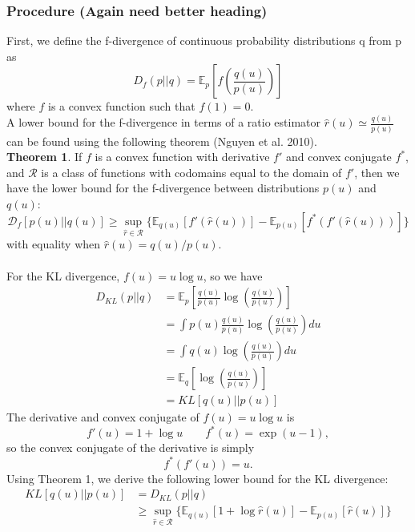 \documentclass[a4paper,12pt]{article}
\numberwithin{equation}{section}
\begin{document}
\subsubsection{Procedure (Again need better heading)}
First, we define the f-divergence of continuous probability distributions q from p as
\[D_f(p||q)=\mathbb{E}_p\left[f\left(\frac{q(u)}{p(u)}\right)\right]\]
where $f$ is a convex function such that $f(1)=0$.\\
A lower bound for the f-divergence in terms of a ratio estimator $\hat{r}(u)\simeq \frac{q(u)}{p(u)}$ can be found using the following theorem (Nguyen et al. 2010).\\
\textbf{Theorem 1}. If $f$ is a convex function with derivative $f'$ and convex conjugate $f^*$, and $\mathcal{R}$ is a class of functions with codomains equal to the domain of $f'$, then we have the lower bound for the f-divergence between distributions $p(u)$ and $q(u)$:
\[\mathcal{D}_f [p(u)||q(u)]\geq \sup_{\hat{r}\in \mathcal{R}} \{\mathbb{E}_{q(u)}[f'(\hat{r}(u))]-\mathbb{E}_{p(u)}[f^*(f'(\hat{r}(u)))]\}\]
with equality when $\hat{r}(u)=q(u)/p(u)$.\\
\\
For the KL divergence, $f(u)=u\log u$, so we have
\begin{align*}
D_{KL}(p||q)&=\mathbb{E}_p\left[\frac{q(u)}{p(u)}\log \left(\frac{q(u)}{p(u)}\right)\right]\\
&=\int p(u)\frac{q(u)}{p(u)}\log\left(\frac{q(u)}{p(u)}\right)du\\
&= \int q(u)\log\left(\frac{q(u)}{p(u)}\right)du\\
&= \mathbb{E}_q\left[\log \left(\frac{q(u)}{p(u)}\right)\right]\\
&=KL[q(u)||p(u)]
\end{align*}
The derivative and convex conjugate of $f(u)=u\log u$ is
\[f'(u)=1+\log u \qquad f^*(u)=\exp(u-1),\]
so the convex conjugate of the derivative is simply
\[f^*(f'(u))=u.\]
Using Theorem 1, we derive the following lower bound for the KL divergence:
\begin{align*}
KL[q(u)||p(u)]&=D_{KL}(p||q)\\
&\geq \sup_{\hat{r}\in \mathcal{R}}\{\mathbb{E}_{q(u)}[1+\log \hat{r}(u)]-\mathbb{E}_{p(u)}[\hat{r}(u)]\}
\end{align*}
\newpage
\end{document}
